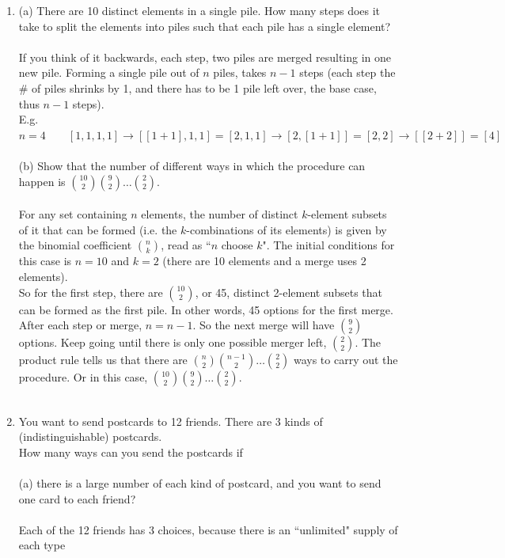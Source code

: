 \documentclass[10pt,a4paper,final]{article}
\begin{document}
\begin{enumerate}
\item %
(a) There are 10 distinct elements in a single pile.
How many steps does it take to split the elements into piles such that
each pile has a single element?\\
\\
If you think of it backwards, each step, two piles are merged
resulting in one new pile. Forming a single pile out of $n$ piles, takes $n-1$ steps
(each step the \# of piles shrinks by 1, and there has to be 1 pile left over, the base case,
thus $n-1$ steps).\\
E.g. $n = 4 \qquad [1,1,1,1] \rightarrow [[1 + 1],1,1] = [2,1,1]
\rightarrow [2,[1 + 1]] = [2,2] \rightarrow [[2 + 2]] = [4]$\\
\\
(b) Show that the number of different ways in which the procedure can happen
is ${10 \choose 2} {9 \choose 2} \dots {2 \choose 2}$.\\
\\
For any set containing $n$ elements, the number of distinct $k$-element
subsets of it that can be formed (i.e. the $k$-combinations of its elements)
is given by the binomial coefficient $\binom{n}{k}$, read as ``$n$ choose $k$".
The initial conditions for this case is $n = 10$ and $k = 2$
(there are 10 elements and a merge uses 2 elements).\\
So for the first step, there are $10 \choose 2$, or 45, distinct 2-element subsets that
can be formed as the first pile. In other words, 45 options for the first merge.
After each step or merge, $n = n - 1$. So the next merge will have $9 \choose 2$ options.
Keep going until there is only one possible merger left, $2 \choose 2$.
The product rule tells us that there are $\binom{n}{2} \binom{n-1}{2} \dots \binom{2}{2}$
ways to carry out the procedure. Or in this case,
$\binom{10}{2} \binom{9}{2} \dots \binom{2}{2}$.\\
\\
\item %
You want to send postcards to 12 friends. There are 3 kinds of (indistinguishable) postcards.\\
How many ways can you send the postcards if\\
\\
(a) there is a large number of each kind of postcard,
and you want to send one card to each friend?\\
\\
Each of the 12 friends has 3 choices, because there is an ``unlimited" supply of each type

\end{enumerate}
\end{document}

